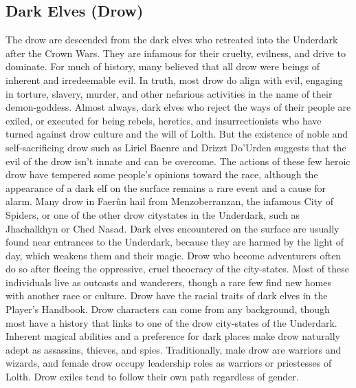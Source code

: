 \documentclass[10pt,a4paper,twoside,twocolumn,openany,bg=print,nodeprecatedcode]{dndbook}
\begin{document}
\subsection{Dark Elves (Drow)}
The drow are descended from the dark elves who retreated into the Underdark after the Crown Wars. They are infamous for their cruelty, evilness, and drive to dominate.
For much of history, many believed that all drow were beings of inherent and irredeemable evil. In truth, most drow do align with evil, engaging in torture, slavery, murder, and other nefarious activities in the name of their demon-goddess. Almost always, dark elves who reject the ways of their people are exiled, or executed for being rebels, heretics, and insurrectionists who have turned against drow culture and the will of Lolth. But the existence of noble and self-sacrificing drow such as Liriel Baenre and Drizzt Do'Urden suggests that the evil of the drow isn't innate and can be overcome. The actions of these few heroic drow have tempered some people's opinions toward the race, although the appearance of a dark elf on the surface remains a rare event and a cause for alarm.
Many drow in Faerûn hail from Menzoberranzan, the infamous City of Spiders, or one of the other drow citystates in the Underdark, such as Jhachalkhyn or Ched Nasad. Dark elves encountered on the surface are usually found near entrances to the Underdark, because they are harmed by the light of day, which weakens them and their magic. Drow who become adventurers often do so after fleeing the oppressive, cruel theocracy of the city-states. Most of these individuals live as outcasts and wanderers, though a rare few find new homes with another race or culture.
Drow have the racial traits of dark elves in the Player's Handbook. Drow characters can come from any background, though most have a history that links to one of the drow city-states of the Underdark.
Inherent magical abilities and a preference for dark places make drow naturally adept as assassins, thieves, and spies. Traditionally, male drow are warriors and wizards, and female drow occupy leadership roles as warriors or priestesses of Lolth. Drow exiles tend to follow their own path regardless of gender.
\end{document}
